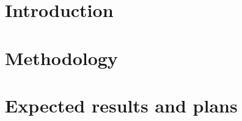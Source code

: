 \documentclass[10pt,notitlepage]{article}
\begin{document}


\section{Introduction}
\label{sec:Introduction}


%

%

\section{Methodology}
\label{sec:Methodology}


\section{Expected results and plans}
\label{sec:Results}



%
\end{document}
